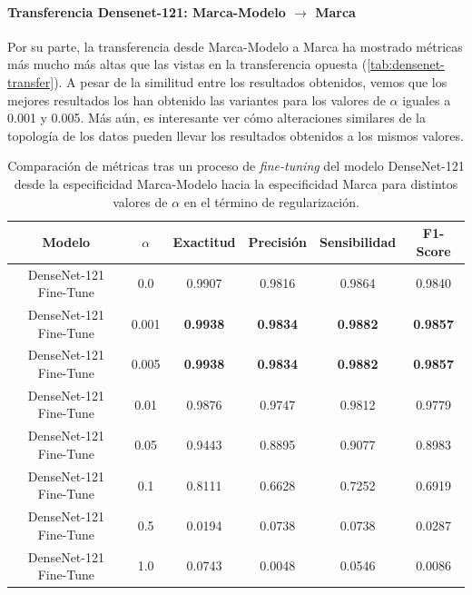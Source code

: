 \paragraph{Transferencia Densenet-121: Marca-Modelo $\to$ Marca}

Por su parte, la transferencia desde Marca-Modelo a Marca ha mostrado métricas
más mucho más altas que las vistas en la transferencia opuesta (\autoref{tab:densenet-transfer}).
A pesar de la similitud entre los resultados obtenidos, vemos que los mejores
resultados los han obtenido las variantes para los valores de $\alpha$ iguales a
0.001 y 0.005. Más aún, es interesante ver cómo alteraciones similares de la
topología de los datos pueden llevar los resultados obtenidos a los mismos
valores. %

\begin{table}[H]
	\centering
	\begin{adjustbox}
		{width=0.8\textwidth}
		\begin{tabular}{|c|c|c|c|c|c|}
			\hline
			\textbf{Modelo}        & $\alpha$ & \textbf{Exactitud} & \textbf{Precisión} & \textbf{Sensibilidad} & \textbf{F1-Score} \\
			\hline
			DenseNet-121 Fine-Tune & 0.0      & 0.9907             & 0.9816             & 0.9864                & 0.9840            \\
			\hline
			DenseNet-121 Fine-Tune & 0.001    & \textbf{0.9938}    & \textbf{0.9834}    & \textbf{0.9882}       & \textbf{0.9857}   \\
			\hline
			DenseNet-121 Fine-Tune & 0.005    & \textbf{0.9938}    & \textbf{0.9834}    & \textbf{0.9882}       & \textbf{0.9857}   \\
			\hline
			DenseNet-121 Fine-Tune & 0.01     & 0.9876             & 0.9747             & 0.9812                & 0.9779            \\
			\hline
			DenseNet-121 Fine-Tune & 0.05     & 0.9443             & 0.8895             & 0.9077                & 0.8983            \\
			\hline
			DenseNet-121 Fine-Tune & 0.1      & 0.8111             & 0.6628             & 0.7252                & 0.6919            \\
			\hline
			DenseNet-121 Fine-Tune & 0.5      & 0.0194             & 0.0738             & 0.0738                & 0.0287            \\
			\hline
			DenseNet-121 Fine-Tune & 1.0      & 0.0743             & 0.0048             & 0.0546                & 0.0086            \\
			\hline
		\end{tabular}
	\end{adjustbox}
	\caption{Comparación de métricas tras un proceso de \textit{fine-tuning} del modelo
		DenseNet-121 desde la especificidad Marca-Modelo hacia la especificidad Marca para
		distintos valores de $\alpha$ en el término de regularización.}
	\label{tab:densenet-transfer}
\end{table}

